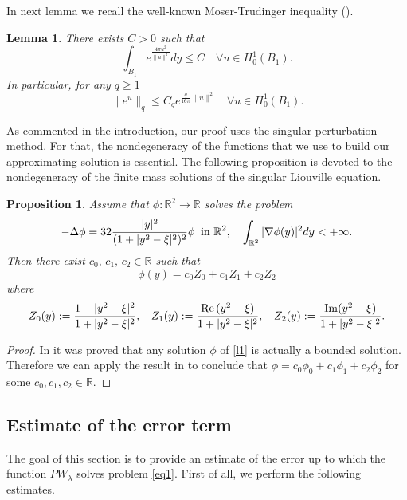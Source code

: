 \documentclass[reqno,11pt]{amsart}
\newtheorem{lemma}[thm]{Lemma}
\newtheorem{prop}[thm]{Proposition}
\theoremstyle{definition}
\numberwithin{equation}{section}
\newcommand{\rr}{\mathbb{R}}
\newcommand{\R}{\mathbb{R}}
\newcommand{\la}{\lambda}
\renewcommand{\(}{\left(}
\renewcommand{\)}{\right)}
\renewcommand{\[}{\left[}
\renewcommand{\]}{\right]}
\def\Re{{\rm Re}\,}
\def\Im{{\rm Im}}
\begin{document}
{In next lemma we recall the well-known Moser-Trudinger inequality
(\cite{Moe, Tru}).

\begin{lemma}\label{tmt} There exists $C>0$ such that 
 $$\int_{B_1} e^{\frac{4\pi u^2}{\|u\|^2}}dy\le C \quad \forall u\in{ H}^1_0(B_1).$$ 
 In particular,  for any $q\geq 1$
 $$\| e^{u}\|_{q}\le  
 C_q e^{{\frac{q}{ 16\pi}}\|u\|^2}\quad \forall  u\in{H}^1_0(B_1).$$

\end{lemma}


As commented in the introduction, our proof uses the singular
perturbation method. For that, the nondegeneracy of the functions
that we use to build our approximating solution is essential. The following
proposition is devoted to the nondegeneracy of the finite mass 
solutions of the singular  Liouville equation.

\begin{prop}
\label{esposito} Assume that $\phi:\R^2\to\R$  solves the problem
\begin{equation}\label{l1}
-\Delta \phi =32{|y|^{2}\over (1+|y^{2}-\xi|^2)^2}\phi\;\;
\hbox{in}\ \rr^2,\quad \int_{\R^2}|\nabla
\phi(y)|^2dy<+\infty.
\end{equation}
 Then there exist $c_0,\,c_1,\, c_2\in\R$
such that
$$\phi(y)=c_0  Z_0+ c_1Z_1 +c_2Z_2$$ where
$$Z_0(y):   = {1-|y^{2}-\xi|^2\over 1+|y^{2}-\xi|^2} ,\ \; \;Z_1(y):={ \Re(y^{2}-\xi)\over  1+|y^{2}-\xi|^2} 
,\ \;\;Z_2(y):={ \Im(y^{2}-\xi)\over  1+|y^{2}-\xi|^2}.
$$ \end{prop}
\begin{proof}
In \cite[Theorem 6.1]{gpistoia} it was proved that any solution
$\phi$ of \eqref{l1} is actually a bounded solution. Therefore we
can apply the result in \cite{dem} to conclude that $\phi= c_0 \phi_0 + c_1
\phi_1 + c_2 \phi_2$ for some $c_0,c_1,c_2\in \R$.

\end{proof}















\subsection{{\large{Estimate of the error term}}}
The goal of this section is to  provide an estimate of the error up to which the function $PW_\la$ solves problem \eqref{eq1}.
First of all, we perform the following estimates.

}
\end{document}
